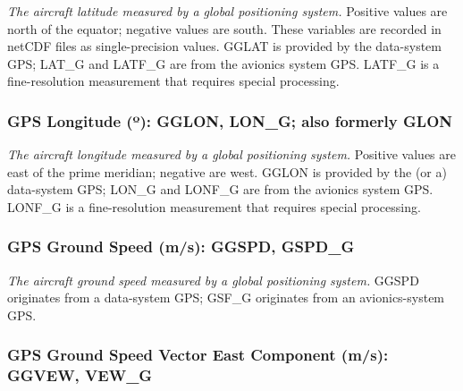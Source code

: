 \documentclass[
]{book}
\begin{document}
\emph{The aircraft latitude measured by a global positioning system.} Positive values are north of the equator; negative values are south. These variables are recorded in netCDF files as single-precision values. GGLAT is provided by the data-system GPS; LAT\_G and LATF\_G are from the avionics system GPS. LATF\_G is a fine-resolution measurement that requires special processing.

\hypertarget{gglon}{%
\subsubsection*{\texorpdfstring{GPS Longitude ({º}): GGLON, LON\_G; also formerly GLON}{GPS Longitude (º): GGLON, LON\_G; also formerly GLON}}\label{gglon}}

\emph{The aircraft longitude measured by a global positioning system.} Positive values are east of the prime meridian; negative are west. GGLON is provided by the (or a) data-system GPS; LON\_G and LONF\_G are from the avionics system GPS. LONF\_G is a fine-resolution measurement that requires special processing.

\hypertarget{ggspd}{%
\subsubsection*{GPS Ground Speed (m/s): GGSPD, GSPD\_G}\label{ggspd}}

\emph{The aircraft ground speed measured by a global positioning system.} GGSPD originates from a data-system GPS; GSF\_G originates from an avionics-system GPS.

\hypertarget{ggvew}{%
\subsubsection*{GPS Ground Speed Vector East Component (m/s): GGVEW, VEW\_G}\label{ggvew}}
\end{document}
